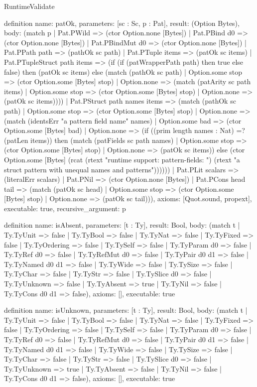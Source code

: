\begin{lexlean}{RuntimeValidate}
\begin{semanticmodule}
definition{
  name: patOk,
  parameters: [sc : Sc, p : Pat],
  result: (Option Bytes),
  body: (match p
    | Pat.PWild => (ctor Option.none [Bytes])
    | Pat.PBind d0 => (ctor Option.none [Bytes])
    | Pat.PBindMut d0 => (ctor Option.none [Bytes])
    | Pat.PPath path => (pathOk sc path)
    | Pat.PTuple items => (patOk sc items)
    | Pat.PTupleStruct path items => (if (if (patWrapperPath path) then true else false) then (patOk sc items) else (match (pathOk sc path)
      | Option.some stop => (ctor Option.some [Bytes] stop)
      | Option.none => (match (patArity sc path items)
        | Option.some stop => (ctor Option.some [Bytes] stop)
        | Option.none => (patOk sc items))))
    | Pat.PStruct path names items => (match (pathOk sc path)
      | Option.some stop => (ctor Option.some [Bytes] stop)
      | Option.none => (match (identsErr "a pattern field name" names)
        | Option.some bad => (ctor Option.some [Bytes] bad)
        | Option.none => (if ((prim length names : Nat) =? (patLen items)) then (match (patFields sc path names)
          | Option.some stop => (ctor Option.some [Bytes] stop)
          | Option.none => (patOk sc items)) else (ctor Option.some [Bytes] (rcat (rtext "runtime support: pattern-fields: ") (rtext "a struct pattern with unequal names and patterns"))))))
    | Pat.PLit scalars => (literalErr scalars)
    | Pat.PNil => (ctor Option.none [Bytes])
    | Pat.PCons head tail => (match (patOk sc head)
      | Option.some stop => (ctor Option.some [Bytes] stop)
      | Option.none => (patOk sc tail))),
  axioms: [Quot.sound, propext],
  executable: true,
  recursive_argument: p
}

definition{
  name: isAbsent,
  parameters: [t : Ty],
  result: Bool,
  body: (match t
    | Ty.TyUnit => false
    | Ty.TyBool => false
    | Ty.TyNat => false
    | Ty.TyFixed => false
    | Ty.TyOrdering => false
    | Ty.TySelf => false
    | Ty.TyParam d0 => false
    | Ty.TyRef d0 => false
    | Ty.TyRefMut d0 => false
    | Ty.TyPair d0 d1 => false
    | Ty.TyNamed d0 d1 => false
    | Ty.TyWide => false
    | Ty.TySize => false
    | Ty.TyChar => false
    | Ty.TyStr => false
    | Ty.TySlice d0 => false
    | Ty.TyUnknown => false
    | Ty.TyAbsent => true
    | Ty.TyNil => false
    | Ty.TyCons d0 d1 => false),
  axioms: [],
  executable: true
}

definition{
  name: isUnknown,
  parameters: [t : Ty],
  result: Bool,
  body: (match t
    | Ty.TyUnit => false
    | Ty.TyBool => false
    | Ty.TyNat => false
    | Ty.TyFixed => false
    | Ty.TyOrdering => false
    | Ty.TySelf => false
    | Ty.TyParam d0 => false
    | Ty.TyRef d0 => false
    | Ty.TyRefMut d0 => false
    | Ty.TyPair d0 d1 => false
    | Ty.TyNamed d0 d1 => false
    | Ty.TyWide => false
    | Ty.TySize => false
    | Ty.TyChar => false
    | Ty.TyStr => false
    | Ty.TySlice d0 => false
    | Ty.TyUnknown => true
    | Ty.TyAbsent => false
    | Ty.TyNil => false
    | Ty.TyCons d0 d1 => false),
  axioms: [],
  executable: true
}


\end{semanticmodule}
\end{lexlean}
